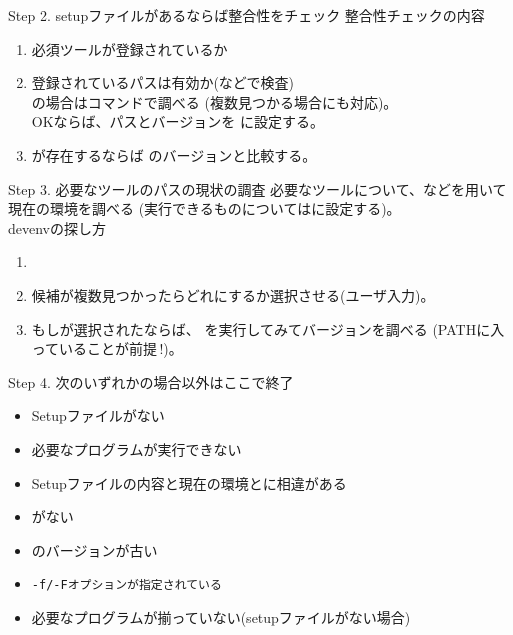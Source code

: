\begin{Description}{Step 2. setupファイルがあるならば整合性をチェック}
 	整合性チェックの内容
 	\begin{enumerate}
	  \item 必須ツールが登録されているか
	  \item 登録されているパスは有効か(などで検査)\\
		   の場合はコマンドで調べる
		   (複数見つかる場合にも対応)。\\
		   OKならば、パスとバージョンを
		   に設定する。
	  \item {}が存在するならば
		   のバージョンと比較する。
	\end{enumerate}
\end{Description}

\begin{Description}{Step 3. 必要なツールのパスの現状の調査}
	必要なツールについて、などを用いて現在の環境を調べる
	(実行できるものについてはに設定する)。\\
	devenvの探し方
	\begin{enumerate}
	  \item	{}
	  \item	候補が複数見つかったらどれにするか選択させる(ユーザ入力)。
	  \item	もしが選択されたならば、
		 を実行してみてバージョンを調べる
		(PATHに入っていることが前提\,!)。
	\end{enumerate}
\end{Description}

\begin{Description}{Step 4. 次のいずれかの場合以外はここで終了}
	\begin{itemize}
	  \item	Setupファイルがない
	  \item	必要なプログラムが実行できない
	  \item	Setupファイルの内容と現在の環境とに相違がある
	  \item	{}がない
	  \item	{}のバージョンが古い
	  \item	\tt{-f}/\tt{-F}オプションが指定されている
	  \item	必要なプログラムが揃っていない(setupファイルがない場合)
	\end{itemize}
\end{Description}

